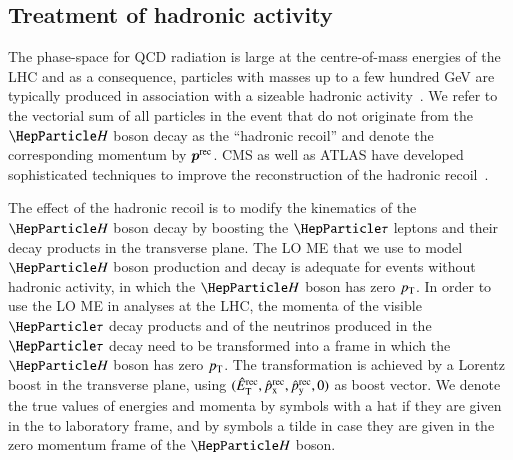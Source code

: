 \subsection{Treatment of hadronic activity}
\label{sec:mem_hadRecoil}

The phase-space for QCD radiation is large at the centre-of-mass
energies of the LHC
and as a consequence, particles with masses up to a few hundred GeV 
are typically produced in association with a sizeable hadronic activity~\cite{Alwall:2010cq}.
We refer to the vectorial sum of all particles in the event that do not originate from the $\PHiggs$ boson decay
as the ``hadronic recoil'' and denote the corresponding momentum by $\bm{p}^{\textrm{rec}}$.
CMS as well as ATLAS have developed sophisticated techniques to improve the reconstruction 
of the hadronic recoil~\cite{CMS-JME-13-003,ATLAS-CONF-2014-019}.

The effect of the hadronic recoil is to modify the kinematics of the $\PHiggs$ boson decay
by boosting the $\Pgt$ leptons and their decay products in the transverse plane.
The LO ME that we use to model $\PHiggs$ boson production and decay
is adequate for events without hadronic activity,
in which the $\PHiggs$ boson has zero $p_{\textrm{T}}$.
In order to use the LO ME in analyses at the LHC,
the momenta of the visible $\Pgt$ decay products and of the neutrinos produced in the $\Pgt$ decay
need to be transformed into a frame in which the $\PHiggs$ boson has zero $p_{\textrm{T}}$.
The transformation is achieved by a Lorentz boost in the transverse plane,
using $(\hat{E}_{\textrm{T}}^{\textrm{rec}}, \hat{p}_{\textrm{x}}^{\textrm{rec}}, \hat{p}_{\textrm{y}}^{\textrm{rec}}, 0)$ as boost
vector.
We denote the true values of energies and momenta by symbols with a
hat if they are given in the to laboratory frame, and by symbols a tilde in case they are given in the zero momentum frame of the $\PHiggs$ boson.

